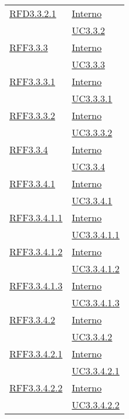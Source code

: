 \begin{longtable}{|>{\centering}m{5cm}|m{5cm}<{\centering}|}
\hyperlink{RFD3.3.2.1}{RFD3.3.2.1} & \hyperlink{Interno}{Interno}\\
& \hyperref[UC3.3.2]{UC3.3.2}\\ \hline

\hyperlink{RFF3.3.3}{RFF3.3.3} & \hyperlink{Interno}{Interno}\\
& \hyperref[UC3.3.3]{UC3.3.3}\\ \hline

\hyperlink{RFF3.3.3.1}{RFF3.3.3.1} & \hyperlink{Interno}{Interno}\\
& \hyperref[UC3.3.3.1]{UC3.3.3.1}\\ \hline

\hyperlink{RFF3.3.3.2}{RFF3.3.3.2} & \hyperlink{Interno}{Interno}\\
& \hyperref[UC3.3.3.2]{UC3.3.3.2}\\ \hline

\hyperlink{RFF3.3.4}{RFF3.3.4} & \hyperlink{Interno}{Interno}\\
& \hyperref[UC3.3.4]{UC3.3.4}\\ \hline

\hyperlink{RFF3.3.4.1}{RFF3.3.4.1} & \hyperlink{Interno}{Interno}\\
& \hyperref[UC3.3.4.1]{UC3.3.4.1}\\ \hline

\hyperlink{RFF3.3.4.1.1}{RFF3.3.4.1.1} & \hyperlink{Interno}{Interno}\\
& \hyperref[UC3.3.4.1.1]{UC3.3.4.1.1}\\ \hline

\hyperlink{RFF3.3.4.1.2}{RFF3.3.4.1.2} & \hyperlink{Interno}{Interno}\\
& \hyperref[UC3.3.4.1.2]{UC3.3.4.1.2}\\ \hline

\hyperlink{RFF3.3.4.1.3}{RFF3.3.4.1.3} & \hyperlink{Interno}{Interno}\\
& \hyperref[UC3.3.4.1.3]{UC3.3.4.1.3}\\ \hline

\hyperlink{RFF3.3.4.2}{RFF3.3.4.2} & \hyperlink{Interno}{Interno}\\
& \hyperref[UC3.3.4.2]{UC3.3.4.2}\\ \hline

\hyperlink{RFF3.3.4.2.1}{RFF3.3.4.2.1} & \hyperlink{Interno}{Interno}\\
& \hyperref[UC3.3.4.2.1]{UC3.3.4.2.1}\\ \hline

\hyperlink{RFF3.3.4.2.2}{RFF3.3.4.2.2} & \hyperlink{Interno}{Interno}\\
& \hyperref[UC3.3.4.2.2]{UC3.3.4.2.2}\\ \hline


\end{longtable}
